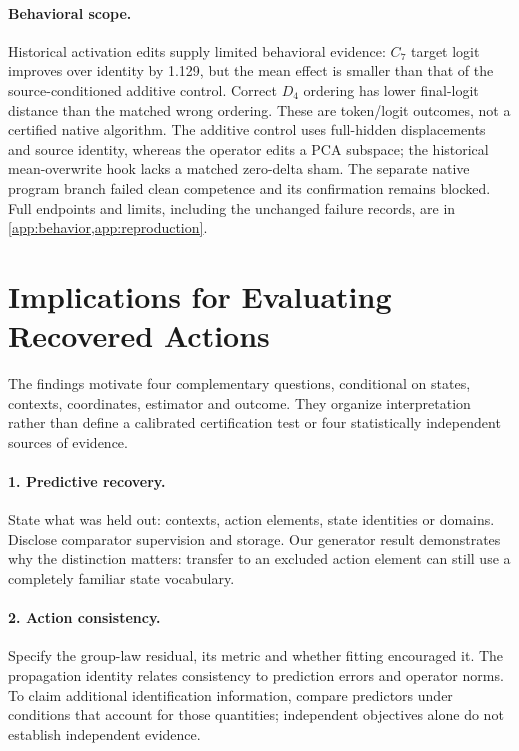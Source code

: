 \documentclass[10pt]{article}
\begin{document}
\paragraph{Behavioral scope.}
Historical activation edits supply limited behavioral evidence: $C_7$ target logit improves over identity by 1.129, but the mean effect is smaller than that of the source-conditioned additive control. Correct $D_4$ ordering has lower final-logit distance than the matched wrong ordering. These are token/logit outcomes, not a certified native algorithm. The additive control uses full-hidden displacements and source identity, whereas the operator edits a PCA subspace; the historical mean-overwrite hook lacks a matched zero-delta sham. The separate native program branch failed clean competence and its confirmation remains blocked. Full endpoints and limits, including the unchanged failure records, are in \cref{app:behavior,app:reproduction}.



\section{Implications for Evaluating Recovered Actions}
\label{sec:reading-protocol}
The findings motivate four complementary questions, conditional on states, contexts, coordinates, estimator and outcome. They organize interpretation rather than define a calibrated certification test or four statistically independent sources of evidence.

\paragraph{1. Predictive recovery.}
State what was held out: contexts, action elements, state identities or domains. Disclose comparator supervision and storage. Our generator result demonstrates why the distinction matters: transfer to an excluded action element can still use a completely familiar state vocabulary.

\paragraph{2. Action consistency.}
Specify the group-law residual, its metric and whether fitting encouraged it. The propagation identity relates consistency to prediction errors and operator norms. To claim additional identification information, compare predictors under conditions that account for those quantities; independent objectives alone do not establish independent evidence.
\end{document}
